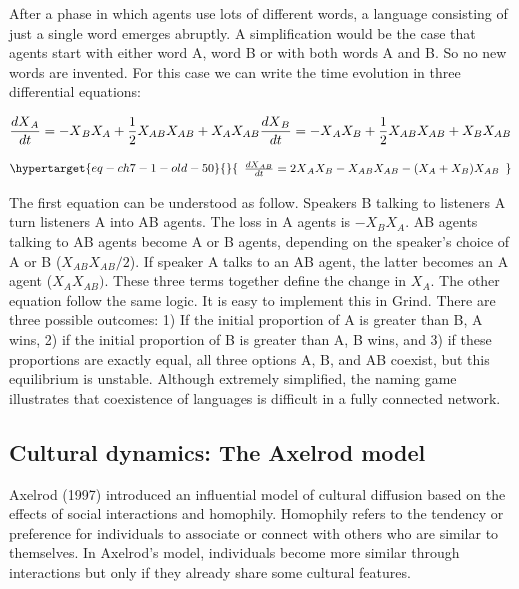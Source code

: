 \documentclass[
  a4paper,
  DIV=11,
  numbers=noendperiod,
  oneside]{scrreprt}
\begin{document}
After a phase in which agents use lots of different words, a language
consisting of just a single word emerges abruptly. A simplification
would be the case that agents start with either word A, word B or with
both words A and B. So no new words are invented. For this case we can
write the time evolution in three differential equations:

\[{\frac{{dX}_{A}}{dt} = {- X}_{B}X_{A} + {\frac{1}{2}}X_{AB}X_{AB} + X_{A}X_{AB}
}\\{\frac{{dX}_{B}}{dt} = {- X}_{A}X_{B} + {\frac{1}{2}}X_{AB}X_{AB} + X_{B}X_{AB}}\]

\begin{equation}\protect\hypertarget{eq-ch7-1-old-50}{}{\begin{array}{r}
\frac{{dX}_{AB}}{dt} = {2X}_{A}X_{B} - X_{AB}X_{AB} - (X_{A}+ X_{B})X_{AB}
\end{array}}\label{eq-ch7-1-old-50}\end{equation}

The first equation can be understood as follow. Speakers B talking to
listeners A turn listeners A into AB agents. The loss in A agents is
\({- X}_{B}X_{A}\). AB agents talking to AB agents become A or B agents,
depending on the speaker's choice of A or B (\({X}_{AB}X_{AB}/2\)). If
speaker A talks to an AB agent, the latter becomes an A agent
(\(X_{A}X_{AB})\). These three terms together define the change in
\(X_{A}.\) The other equation follow the same logic. It is easy to
implement this in Grind. There are three possible outcomes: 1) If the
initial proportion of A is greater than B, A wins, 2) if the initial
proportion of B is greater than A, B wins, and 3) if these proportions
are exactly equal, all three options A, B, and AB coexist, but this
equilibrium is unstable. Although extremely simplified, the naming game
illustrates that coexistence of languages is difficult in a fully
connected network.

\hypertarget{sec-Cultural-dynamics-The-Axelrod-model}{%
\subsection{Cultural dynamics: The Axelrod
model}\label{sec-Cultural-dynamics-The-Axelrod-model}}

Axelrod (1997) introduced an influential model of cultural diffusion
based on the effects of social interactions and homophily. Homophily
refers to the tendency or preference for individuals to associate or
connect with others who are similar to themselves. In Axelrod's model,
individuals become more similar through interactions but only if they
already share some cultural features.
\end{document}
